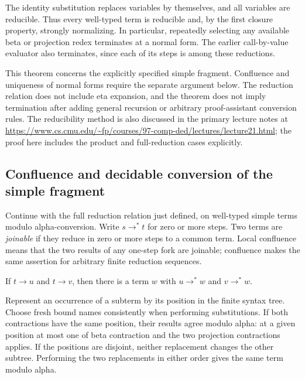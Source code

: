The identity substitution replaces variables by themselves, and all
variables are reducible. Thus every well-typed term is reducible and,
by the first closure property, strongly normalizing. In particular,
repeatedly selecting any available beta or projection redex terminates
at a normal form. The earlier call-by-value evaluator also terminates,
since each of its steps is among these reductions.
\Done

This theorem concerns the explicitly specified simple fragment. Confluence
and uniqueness of normal forms require the separate argument below. The
reduction relation does not include eta expansion, and the theorem does
not imply termination after adding
general recursion or arbitrary proof-assistant conversion rules. The
reducibility method is also discussed in the primary lecture notes at
\url{https://www.cs.cmu.edu/~fp/courses/97-comp-ded/lectures/lecture21.html};
the proof here includes the product and full-reduction cases explicitly.

\subsection{Confluence and decidable conversion of the simple fragment}
Continue with the full reduction relation just defined, on well-typed
simple terms modulo alpha-conversion. Write $s\to^*t$ for zero or more
steps. Two terms are \emph{joinable} if they reduce in zero or more steps
to a common term. Local confluence means that the two results of any
one-step fork are joinable; confluence makes the same assertion for
arbitrary finite reduction sequences.

\begin{lemma}
If $t\to u$ and $t\to v$, then there is a term $w$ with
$u\to^*w$ and $v\to^*w$.
\end{lemma}
\Proof
Represent an occurrence of a subterm by its position in the finite syntax
tree. Choose fresh bound names consistently when performing substitutions.
If both contractions have the same position, their results agree modulo
alpha: at a given position at most one of beta contraction and the two
projection contractions applies. If the positions are disjoint, neither
replacement changes the other subtree. Performing the two replacements
in either order gives the same term modulo alpha.

